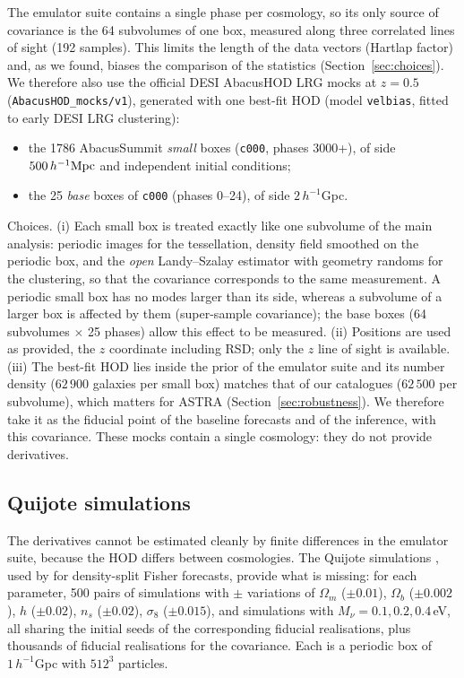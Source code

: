 The emulator suite contains a single phase per cosmology, so its only source of covariance is the 64 subvolumes of one box, measured along three correlated lines of sight (192 samples). This limits the length of the data vectors (Hartlap factor) and, as we found, biases the comparison of the statistics (Section~\ref{sec:choices}). We therefore also use the official DESI AbacusHOD LRG mocks at $z=0.5$ \cite{Yuan2022} (\texttt{AbacusHOD\_mocks/v1}), generated with one best-fit HOD (model \texttt{velbias}, fitted to early DESI LRG clustering):
\begin{itemize}
\item the 1786 AbacusSummit \emph{small} boxes (\texttt{c000}, phases 3000+), of side $500\,h^{-1}\mathrm{Mpc}$ and independent initial conditions;
\item the 25 \emph{base} boxes of \texttt{c000} (phases 0--24), of side $2\,h^{-1}$Gpc.
\end{itemize}
Choices. (i) Each small box is treated exactly like one subvolume of the main analysis: periodic images for the tessellation, density field smoothed on the periodic box, and the \emph{open} Landy--Szalay estimator with geometry randoms for the clustering, so that the covariance corresponds to the same measurement. A periodic small box has no modes larger than its side, whereas a subvolume of a larger box is affected by them (super-sample covariance); the base boxes (64 subvolumes $\times$ 25 phases) allow this effect to be measured. (ii) Positions are used as provided, the $z$ coordinate including RSD; only the $z$ line of sight is available. (iii) The best-fit HOD lies inside the prior of the emulator suite and its number density ($62\,900$ galaxies per small box) matches that of our catalogues ($62\,500$ per subvolume), which matters for ASTRA (Section~\ref{sec:robustness}). We therefore take it as the fiducial point of the baseline forecasts and of the inference, with this covariance. These mocks contain a single cosmology: they do not provide derivatives.

\subsection{Quijote simulations}
\label{sec:quijote_sims}

The derivatives cannot be estimated cleanly by finite differences in the emulator suite, because the HOD differs between cosmologies. The Quijote simulations \cite{Quijote}, used by \cite{Paillas2023} for density-split Fisher forecasts, provide what is missing: for each parameter, 500 pairs of simulations with $\pm$ variations of $\Omega_m$ ($\pm0.01$), $\Omega_b$ ($\pm0.002$), $h$ ($\pm0.02$), $n_s$ ($\pm0.02$), $\sigma_8$ ($\pm0.015$), and simulations with $M_\nu = 0.1, 0.2, 0.4$\,eV, all sharing the initial seeds of the corresponding fiducial realisations, plus thousands of fiducial realisations for the covariance. Each is a periodic box of $1\,h^{-1}$Gpc with $512^3$ particles.

